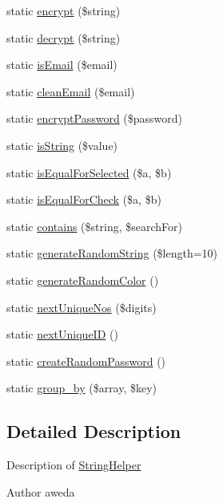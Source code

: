 \begin{DoxyCompactItemize}
static \hyperlink{class_string_helper_ae9e3a9c73027c187773b929cfd261656}{encrypt} (\$string)
\item 
static \hyperlink{class_string_helper_a0d3d44cdb85cb46c64dcfd3a40a96762}{decrypt} (\$string)
\item 
static \hyperlink{class_string_helper_a550104fe06c3f5381138e685835ad520}{is\+Email} (\$email)
\item 
static \hyperlink{class_string_helper_a49bbd9a9ca99d611e3816b1098cd3715}{clean\+Email} (\$email)
\item 
static \hyperlink{class_string_helper_ad611c2fac13ade233caabe6bc05c6e95}{encrypt\+Password} (\$password)
\item 
static \hyperlink{class_string_helper_ab551b5fb6b660c209799491f28127304}{is\+String} (\$value)
\item 
static \hyperlink{class_string_helper_af097d07e43628dd3d31c6dfa73c99ce6}{is\+Equal\+For\+Selected} (\$a, \$b)
\item 
static \hyperlink{class_string_helper_a2e075bc8619ecf388ba7571578ac2b81}{is\+Equal\+For\+Check} (\$a, \$b)
\item 
static \hyperlink{class_string_helper_ae5b51013888eaac91567ccf49321a9ca}{contains} (\$string, \$search\+For)
\item 
static \hyperlink{class_string_helper_a30605cf7b2b5cba1cfb52b869c610835}{generate\+Random\+String} (\$length=10)
\item 
static \hyperlink{class_string_helper_a935266fbf140b15961ca5fd711b2bb64}{generate\+Random\+Color} ()
\item 
static \hyperlink{class_string_helper_aa175d98486ad55620dfcc557854ecb43}{next\+Unique\+Nos} (\$digits)
\item 
static \hyperlink{class_string_helper_ac81c38ccf50e870469b09f8fd13d1467}{next\+Unique\+I\+D} ()
\item 
static \hyperlink{class_string_helper_a6f965e1632d47c32d6b05fe0e815f2bf}{create\+Random\+Password} ()
\item 
static \hyperlink{class_string_helper_ac1567337f8f838a6f1f977a98cfa38a2}{group\+\_\+by} (\$array, \$key)
\end{DoxyCompactItemize}


\subsection{Detailed Description}
Description of \hyperlink{class_string_helper}{String\+Helper}

\begin{DoxyAuthor}{Author}
aweda 
\end{DoxyAuthor}


